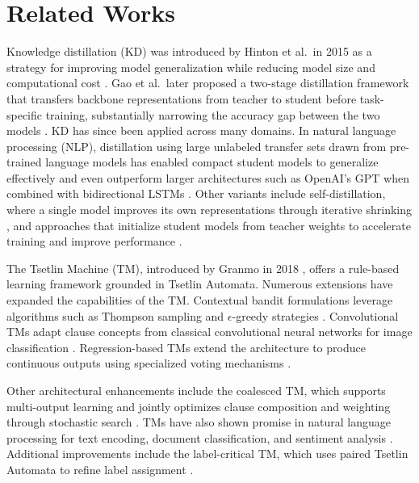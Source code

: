 \documentclass[sn-mathphys-num]{sn-jnl}%
\theoremstyle{thmstyleone}%
\theoremstyle{thmstyletwo}%
\theoremstyle{thmstylethree}%
\begin{document}
\section{Related Works}
Knowledge distillation (KD) was introduced by Hinton et al.\ in 2015 as a strategy for improving model generalization while reducing model size and computational cost \cite{hinton2015distillingknowledgeneuralnetwork}. Gao et al.\ later proposed a two-stage distillation framework that transfers backbone representations from teacher to student before task-specific training, substantially narrowing the accuracy gap between the two models \cite{gao2019embarrassinglysimpleapproachknowledge}. KD has since been applied across many domains. In natural language processing (NLP), distillation using large unlabeled transfer sets drawn from pre-trained language models has enabled compact student models to generalize effectively and even outperform larger architectures such as OpenAI's GPT when combined with bidirectional LSTMs \cite{tang-etal-2019-natural, radford2019language, cui2019deepbidirectionalunidirectionallstm}. Other variants include self-distillation, where a single model improves its own representations through iterative shrinking \cite{zhang2019teacherimproveperformanceconvolutional}, and approaches that initialize student models from teacher weights to accelerate training and improve performance \cite{xu2023initializingmodelslargerones}.

The Tsetlin Machine (TM), introduced by Granmo in 2018 \cite{granmo2018tsetlin, bouneffouf2023multi, bouneffouf2020survey}, offers a rule-based learning framework grounded in Tsetlin Automata. Numerous extensions have expanded the capabilities of the TM. Contextual bandit formulations leverage algorithms such as Thompson sampling and $\epsilon$-greedy strategies \cite{seraj2022tsetlin}. Convolutional TMs adapt clause concepts from classical convolutional neural networks for image classification \cite{granmo2019convolutional, tunheim2023convolutional, convolutional2015introduction}. Regression-based TMs extend the architecture to produce continuous outputs using specialized voting mechanisms \cite{darshana2020regression}.

Other architectural enhancements include the coalesced TM, which supports multi-output learning and jointly optimizes clause composition and weighting through stochastic search \cite{glimsdal2021coalesced, oommen1997stochastic}. TMs have also shown promise in natural language processing for text encoding, document classification, and sentiment analysis \cite{bhattarai2023tsetlin, saha2022relational, saha2023using, berge2019using, yadav2021sentiment}. Additional improvements include the label-critical TM, which uses paired Tsetlin Automata to refine label assignment \cite{abouzeid2022label}.
\end{document}

